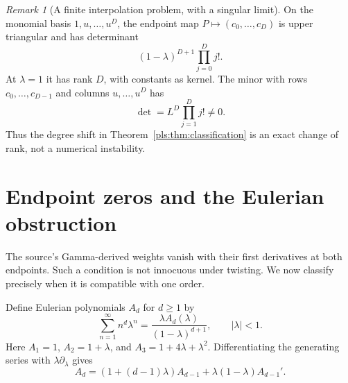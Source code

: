 \documentclass[11pt,letterpaper]{article}
\numberwithin{equation}{section}
\theoremstyle{definition}
\theoremstyle{remark}\newtheorem{remark}[theorem]{Remark}
\begin{document}
\begin{remark}[A finite interpolation problem, with a singular limit]
On the monomial basis $1,u,\ldots,u^D$, the endpoint map
$P\mapsto(c_0,\ldots,c_D)$ is upper triangular and has determinant
\begin{equation}\label{pls:eq:endpointdet}
 (1-\lambda)^{D+1}\prod_{j=0}^D j!.
\end{equation}
At $\lambda=1$ it has rank $D$, with constants as kernel. The minor
with rows $c_0,\ldots,c_{D-1}$ and columns $u,\ldots,u^D$ has
\begin{equation}\label{pls:eq:resdet}
 \det=L^D\prod_{j=1}^D j!\ne0.
\end{equation}
Thus the degree shift in Theorem~\ref{pls:thm:classification} is an
exact change of rank, not a numerical instability.
\end{remark}

\section{Endpoint zeros and the Eulerian obstruction}
\label{pls:sec:flatness}

The source's Gamma-derived weights vanish with their first derivatives
at both endpoints. Such a condition is not innocuous under twisting.
We now classify precisely when it is compatible with one order.

Define Eulerian polynomials $A_d$ for $d\ge1$ by
\begin{equation}\label{pls:eq:Eulerian}
 \sum_{n=1}^\infty n^d\lambda^n
       =\frac{\lambda A_d(\lambda)}{(1-\lambda)^{d+1}},
 \qquad |\lambda|<1.
\end{equation}
Here $A_1=1$, $A_2=1+\lambda$, and
$A_3=1+4\lambda+\lambda^2$. Differentiating the generating series
with $\lambda\partial_\lambda$ gives
\begin{equation}\label{pls:eq:Eulerianrec}
 A_d=(1+(d-1)\lambda)A_{d-1}
          +\lambda(1-\lambda)A_{d-1}'.
\end{equation}
\end{document}
